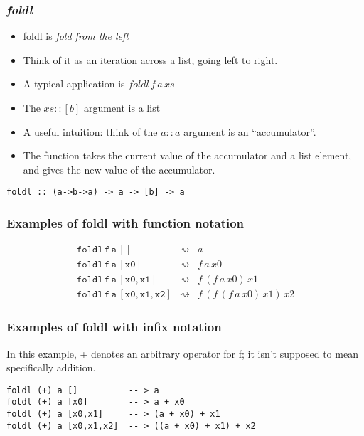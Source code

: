 \documentclass{beamer}
\begin{document}
\begin{frame}[fragile]
\frametitle{\emph{foldl}}

\begin{itemize}
\item foldl is \emph{fold from the left}
\item Think of it as an iteration across a list, going left to
  right.
\item A typical application is $foldl\, f\, a\, xs$
\item The $xs :: [b]$ argument is a list
\item A useful intuition: think of the $a :: a$ argument is an
  ``accumulator''.
\item The function takes the current value of the accumulator and a
  list element, and gives the new value of the accumulator.
\end{itemize}

\begin{verbatim}
foldl :: (a->b->a) -> a -> [b] -> a
\end{verbatim}

\end{frame}

\begin{frame}
\frametitle{Examples of foldl with function notation}

\begin{eqnarray*}
\mathtt{foldl\,f\,a\,[]} & \rightsquigarrow & a\\
\mathtt{foldl\,f\,a\,[x0]} & \rightsquigarrow  & f\,a\,x0\\
\mathtt{foldl\,f\,a\,[x0,x1]} & \rightsquigarrow  & f\,(f\,a\,x0)\,x1\\
\mathtt{foldl\,f\,a\,[x0,x1,x2]} & \rightsquigarrow  & f\,(f\,(f\,a\,x0)\,x1)\, x2
\end{eqnarray*}

\end{frame}

\begin{frame}[fragile]
\frametitle{Examples of foldl with infix notation}

In this example, + denotes an arbitrary operator for f; it isn't
supposed to mean specifically addition.

\begin{verbatim}
foldl (+) a []          -- > a
foldl (+) a [x0]        -- > a + x0
foldl (+) a [x0,x1]     -- > (a + x0) + x1
foldl (+) a [x0,x1,x2]  -- > ((a + x0) + x1) + x2
\end{verbatim}

\end{frame}
\end{document}
